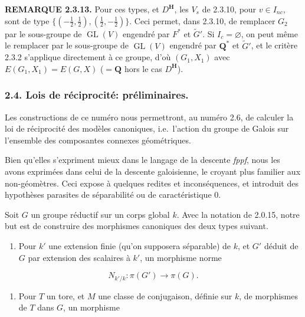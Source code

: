 \documentclass[10pt,a4paper]{article}
\providecommand{\tightlist}{\setlength{\itemsep}{0pt}\setlength{\parskip}{0pt}}
\begin{document}
\textbf{REMARQUE 2.3.13.} Pour ces types, et \(D^{\mathbf H}\), les \(V_s\) de 2.3.10, pour \(v\in I_{nc}\), sont de type \(\{(-\tfrac12,\tfrac12),(\tfrac12,-\tfrac12)\}\). Ceci permet, dans 2.3.10, de remplacer \(G_2\) par le sous-groupe de \(\operatorname{GL}(V)\) engendré par \(F^*\) et \(\widetilde G'\). Si \(I_c=\varnothing\), on peut même le remplacer par le sous-groupe de \(\operatorname{GL}(V)\) engendré par \(\mathbf Q^*\) et \(\widetilde G'\), et le critère 2.3.2 s'applique directement à ce groupe, d'où \((G_1,X_1)\) avec \(E(G_1,X_1)=E(G,X)\) (\(=\mathbf Q\) hors le cas \(D^{\mathbf H}\)).

\subsubsection{2.4. Lois de réciprocité: préliminaires.}

Les constructions de ce numéro nous permettront, au numéro 2.6, de calculer la loi de réciprocité des modèles canoniques, i.e.~l'action du groupe de Galois sur l'ensemble des composantes connexes géométriques.

Bien qu'elles s'expriment mieux dans le langage de la descente \emph{fppf}, nous les avons exprimées dans celui de la descente galoisienne, le croyant plus familier aux non-géomètres. Ceci expose à quelques redites et inconséquences, et introduit des hypothèses parasites de séparabilité ou de caractéristique 0.

Soit \(G\) un groupe réductif sur un corps global \(k\). Avec la notation de 2.0.15, notre but est de construire des morphismes canoniques des deux types suivant.

\begin{enumerate}
\def\labelenumi{(\alph{enumi})}
\tightlist
\item
  Pour \(k'\) une extension finie (qu'on supposera séparable) de \(k\), et \(G'\) déduit de \(G\) par extension des scalaires à \(k'\), un morphisme norme
\end{enumerate}

\[
N_{k'/k}:\pi(G')\longrightarrow\pi(G). \tag{2.4.0.1}
\]

\begin{enumerate}
\def\labelenumi{(\alph{enumi})}
\setcounter{enumi}{1}
\tightlist
\item
  Pour \(T\) un tore, et \(M\) une classe de conjugaison, définie sur \(k\), de morphismes de \(T\) dans \(G\), un morphisme
\end{enumerate}
\end{document}
